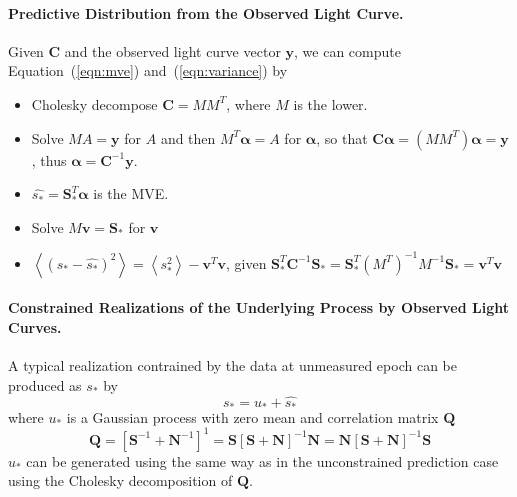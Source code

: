\documentclass[12pt,letterpaper]{article}
\def\sstarhat{\widehat{s_*}}
\def\sstar{s_*}
\def\ustar{u_*}
\def\bcsstar{\mathbf{S}_*}
\def\balpha{\mathbf{\alpha}}
\def\bv{\mathbf{v}}
\def\by{\mathbf{y}}
\def\bcs{\mathbf{S}}
\def\bcn{\mathbf{N}}
\def\bcc{\mathbf{C}}
\def\bcq{\mathbf{Q}}
\begin{document}
\paragraph{Predictive Distribution from the Observed Light Curve.}

Given $\bcc$ and the observed light curve vector $\by$, we can
compute Equation~(\ref{eqn:mve}) and~(\ref{eqn:variance}) by
\begin{itemize}
\item Cholesky decompose $\bcc = MM^T$, where $M$ is the lower.
\item Solve $MA=\by$ for $A$ and then $M^T\balpha=A$ for
$\balpha$, so that $\bcc\balpha=(MM^T)\balpha=\by$, thus
$\balpha=\bcc^{-1}\by$.
\item $\sstarhat = \bcsstar^T\balpha$ is the MVE.
\item Solve $M\bv=\bcsstar$ for $\bv$
\item $\left<(\sstar - \sstarhat)^2\right> = \left<\sstar^2\right> -
\bv^T\bv$, given $\bcsstar^T\bcc^{-1}\bcsstar =
\bcsstar^T(M^T)^{-1}M^{-1}\bcsstar = \bv^T\bv$
\end{itemize}

\paragraph{Constrained Realizations of the Underlying Process by
Observed Light Curves.}
A typical realization contrained by the data at unmeasured epoch can
be produced as $\sstar$ by
\begin{equation} 
\sstar = \ustar + \sstarhat
\end{equation}
where $\ustar$ is a Gaussian process with zero mean and correlation matrix $\bcq$
\begin{equation} 
\bcq = [\bcs^{-1}+\bcn^{-1}]^{1} = \bcs[\bcs+\bcn]^{-1}\bcn =
\bcn[\bcs+\bcn]^{-1}\bcs
\end{equation}
$\ustar$ can be generated using the same way as in the unconstrained
prediction case using the Cholesky decomposition of $\bcq$.





\end{document}
